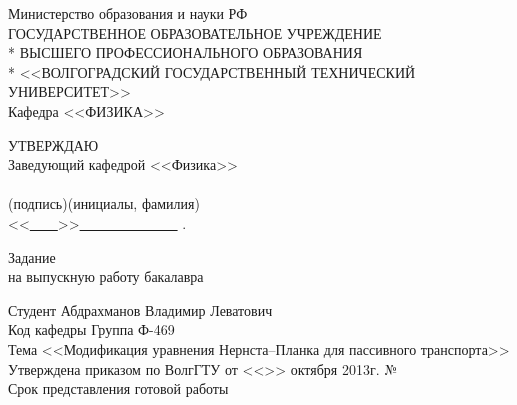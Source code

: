\begin{titlepage}
	\begin{center}
		Министерство образования и науки РФ \\
		\vspace{.5cm}
		ГОСУДАРСТВЕННОЕ ОБРАЗОВАТЕЛЬНОЕ УЧРЕЖДЕНИЕ\\*
		ВЫСШЕГО ПРОФЕССИОНАЛЬНОГО ОБРАЗОВАНИЯ\\*
		<<ВОЛГОГРАДСКИЙ ГОСУДАРСТВЕННЫЙ ТЕХНИЧЕСКИЙ УНИВЕРСИТЕТ>>\\
		\vspace{.5cm}
		Кафедра <<ФИЗИКА>>
		\vspace{.5cm}
	\end{center}
	\begin{flushright}
		УТВЕРЖДАЮ\\
		Заведующий кафедрой <<Физика>>\\
		\vspace{.3cm}
		\underline{\hspace{2cm}}\hspace{1cm}\underline{\hspace{4cm}}\\
		\vspace{-.2cm}\footnotesize(подпись)\hspace{1.8cm}(инициалы, фамилия)
			\hspace*{.2cm}\ \normalsize\\
		\vspace{.3cm}
		<<\underline{\ \ \ \ }>>\underline{\ \ \ \ \ \ \ \ \ \ \ \ \ \ } 
			\the{}.
	\end{flushright}
	\begin{center}
		\large Задание \\
		\normalsize на выпускную работу бакалавра
	\end{center}
	\begin{flushleft}
		Студент Абдрахманов Владимир Леватович\\
		Код кафедры \underline{\hspace{3cm}}\hspace{6cm}Группа Ф-469\\
		Тема <<Модификация уравнения Нернста--Планка для пассивного транспорта>>\\
		Утверждена приказом по ВолгГТУ от <<\underline{\hspace{1cm}}>> 
			октября 2013г. №\underline{\hspace{3.5cm}}\\
		Срок представления готовой работы \underline{\hspace{6cm}}\\

\end{flushleft}
\end{titlepage}

